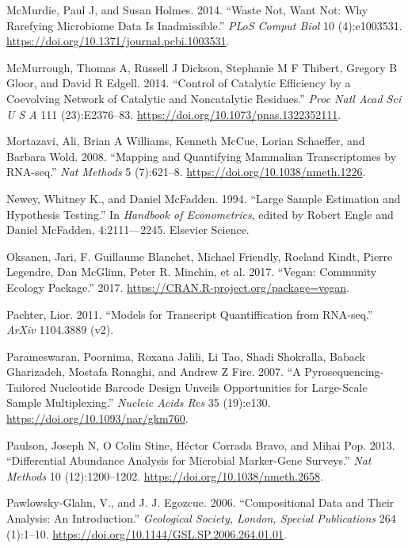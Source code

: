 \documentclass[onecolumn]{book}
\theoremstyle{definition}
\theoremstyle{definition}
\theoremstyle{definition}
\theoremstyle{remark}
\begin{document}
\leavevmode\hypertarget{ref-McMurdie:2014a}{}%
McMurdie, Paul J, and Susan Holmes. 2014. ``Waste Not, Want Not: Why
Rarefying Microbiome Data Is Inadmissible.'' \emph{PLoS Comput Biol} 10
(4):e1003531. \url{https://doi.org/10.1371/journal.pcbi.1003531}.

\leavevmode\hypertarget{ref-mcmurrough:2014}{}%
McMurrough, Thomas A, Russell J Dickson, Stephanie M F Thibert, Gregory
B Gloor, and David R Edgell. 2014. ``Control of Catalytic Efficiency by
a Coevolving Network of Catalytic and Noncatalytic Residues.''
\emph{Proc Natl Acad Sci U S A} 111 (23):E2376--83.
\url{https://doi.org/10.1073/pnas.1322352111}.

\leavevmode\hypertarget{ref-Mortazavi:2008}{}%
Mortazavi, Ali, Brian A Williams, Kenneth McCue, Lorian Schaeffer, and
Barbara Wold. 2008. ``Mapping and Quantifying Mammalian Transcriptomes
by RNA-seq.'' \emph{Nat Methods} 5 (7):621--8.
\url{https://doi.org/10.1038/nmeth.1226}.

\leavevmode\hypertarget{ref-Newey:1994}{}%
Newey, Whitney K., and Daniel McFadden. 1994. ``Large Sample Estimation
and Hypothesis Testing.'' In \emph{Handbook of Econometrics}, edited by
Robert Engle and Daniel McFadden, 4:2111---2245. Elsevier Science.

\leavevmode\hypertarget{ref-vegan:2017}{}%
Oksanen, Jari, F. Guillaume Blanchet, Michael Friendly, Roeland Kindt,
Pierre Legendre, Dan McGlinn, Peter R. Minchin, et al. 2017. ``Vegan:
Community Ecology Package.'' 2017.
\url{https://CRAN.R-project.org/package=vegan}.

\leavevmode\hypertarget{ref-Pachter:2011}{}%
Pachter, Lior. 2011. ``Models for Transcript Quantiffication from
RNA-seq.'' \emph{ArXiv} 1104.3889 (v2).

\leavevmode\hypertarget{ref-Parameswaran:2007aa}{}%
Parameswaran, Poornima, Roxana Jalili, Li Tao, Shadi Shokralla, Baback
Gharizadeh, Mostafa Ronaghi, and Andrew Z Fire. 2007. ``A
Pyrosequencing-Tailored Nucleotide Barcode Design Unveils Opportunities
for Large-Scale Sample Multiplexing.'' \emph{Nucleic Acids Res} 35
(19):e130. \url{https://doi.org/10.1093/nar/gkm760}.

\leavevmode\hypertarget{ref-Paulson:2013aa}{}%
Paulson, Joseph N, O Colin Stine, Héctor Corrada Bravo, and Mihai Pop.
2013. ``Differential Abundance Analysis for Microbial Marker-Gene
Surveys.'' \emph{Nat Methods} 10 (12):1200--1202.
\url{https://doi.org/10.1038/nmeth.2658}.

\leavevmode\hypertarget{ref-Pawlowsky-Glahn:2006}{}%
Pawlowsky-Glahn, V., and J. J. Egozcue. 2006. ``Compositional Data and
Their Analysis: An Introduction.'' \emph{Geological Society, London,
Special Publications} 264 (1):1--10.
\url{https://doi.org/10.1144/GSL.SP.2006.264.01.01}.
\end{document}
